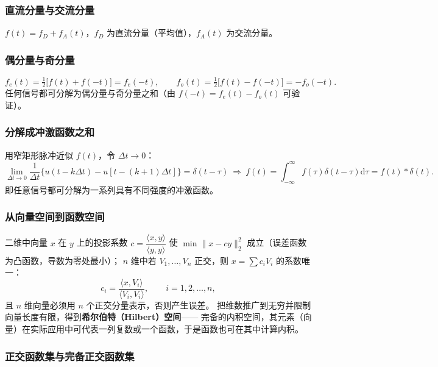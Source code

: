\subsubsection{直流分量与交流分量}

$f(t)=f_D+f_A(t)$，$f_D$ 为直流分量（平均值），$f_A(t)$ 为交流分量。

\subsubsection{偶分量与奇分量}

\begin{equation}
f_e(t)=\tfrac12\big[f(t)+f(-t)\big]=f_e(-t),\qquad
f_o(t)=\tfrac12\big[f(t)-f(-t)\big]=-f_o(-t).
\end{equation}
任何信号都可分解为偶分量与奇分量之和（由 $f(-t)=f_e(t)-f_o(t)$ 可验证）。

\subsubsection{分解成冲激函数之和}

用窄矩形脉冲近似 $f(t)$，令 $\Delta t\to0$：
\begin{equation}
\lim_{\Delta t\to0}\frac{1}{\Delta t}\big\{u(t-k\Delta t)-u[t-(k+1)\Delta t]\big\}=\delta(t-\tau)
\ \Longrightarrow\
f(t)=\int_{-\infty}^{\infty}f(\tau)\delta(t-\tau)\mathrm{d}\tau=f(t)*\delta(t).
\end{equation}
即任意信号都可分解为一系列具有不同强度的冲激函数。

\subsubsection{从向量空间到函数空间}

二维中向量 $x$ 在 $y$ 上的投影系数 $c=\dfrac{\langle x,y\rangle}{\langle y,y\rangle}$
使 $\min\|x-cy\|_2^2$ 成立（误差函数为凸函数，导数为零处最小）；
$n$ 维中若 $V_1,\dots,V_n$ 正交，则 $x=\sum c_iV_i$ 的系数唯一：
\begin{equation}
c_i=\frac{\langle x,V_i\rangle}{\langle V_i,V_i\rangle},\qquad i=1,2,\dots,n,
\end{equation}
且 $n$ 维向量必须用 $n$ 个正交分量表示，否则产生误差。
把维数推广到无穷并限制向量长度有限，得到\textbf{希尔伯特（Hilbert）空间}——
完备的内积空间，其元素（向量）在实际应用中可代表一列复数或一个函数，于是函数也可在其中计算内积。

\subsubsection{正交函数集与完备正交函数集}

